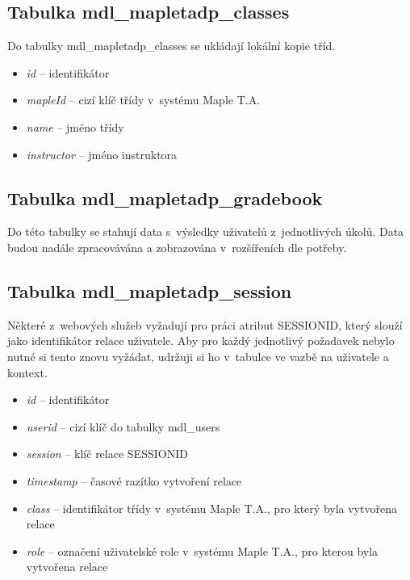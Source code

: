 \documentclass[
print,
  11pt,
  table,   
  nolof,    
  nolot,
  oneside,
  draft
]{fithesis3}
\begin{document}
\subsection*{Tabulka mdl\_mapletadp\_classes}
Do tabulky mdl\_mapletadp\_classes se ukládají lokální kopie tříd.
\begin{itemize}
	\item \textit{id} -- identifikátor
	\item \textit{mapleId} -- cizí klíč třídy v~systému Maple T.A.
	\item \textit{name} -- jméno třídy
	\item \textit{instructor} -- jméno instruktora
\end{itemize}
\subsection*{Tabulka mdl\_mapletadp\_gradebook}
Do této tabulky se stahují data s~výsledky uživatelů z~jednotlivých úkolů. Data budou nadále zpracovávána a zobrazována v~rozšířeních dle potřeby.
\subsection*{Tabulka mdl\_mapletadp\_session}
Některé z~webových služeb vyžadují pro práci atribut SESSIONID, který slouží jako identifikátor relace uživatele. Aby pro každý jednotlivý požadavek nebylo nutné si tento znovu vyžádat, udržuji si ho v~tabulce ve vazbě na uživatele a kontext. 
\begin{itemize}
	\item \textit{id} -- identifikátor
	\item \textit{userid} -- cizí klíč do tabulky mdl\_users
	\item \textit{session} -- klíč relace SESSIONID
	\item \textit{timestamp} -- časové razítko vytvoření relace
	\item \textit{class} -- identifikátor třídy v~systému Maple T.A., pro který byla vytvořena relace
	\item \textit{role} -- označení uživatelské role v~systému Maple T.A., pro kterou byla vytvořena relace
\end{itemize}
\end{document}
